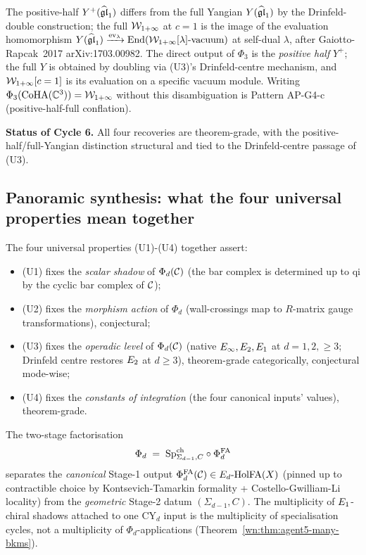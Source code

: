 \begin{remark}
\label{wn:rem:agent5-positive-half-vs-full}
The positive-half $Y^+(\widehat{\mathfrak{gl}}_1)$ differs from the full
Yangian $Y(\widehat{\mathfrak{gl}}_1)$ by the Drinfeld-double construction;
the full $\mathcal{W}_{1+\infty}$ at $c = 1$ is the image of the evaluation
homomorphism $Y(\widehat{\mathfrak{gl}}_1) \xrightarrow{\mathrm{ev}_\lambda} \mathrm{End}(\mathcal{W}_{1+\infty}[\lambda]\text{-vacuum})$
at self-dual $\lambda$, after Gaiotto-Rapcak~2017 arXiv:1703.00982.
The direct output of $\Phi_3$ is the \emph{positive half} $Y^+$; the
full $Y$ is obtained by doubling via (U3)'s Drinfeld-centre mechanism,
and $\mathcal{W}_{1+\infty}[c=1]$ is its evaluation on a specific vacuum module.
Writing $\Phi_3(\mathrm{CoHA}(\mathbb{C}^3)) = \mathcal{W}_{1+\infty}$ without this disambiguation
is Pattern AP-G4-c (positive-half-full conflation).
\end{remark}

\medskip
\noindent\textbf{Status of Cycle 6.} All four recoveries are theorem-grade,
with the positive-half/full-Yangian distinction structural and tied to
the Drinfeld-centre passage of (U3).

\subsection*{Panoramic synthesis: what the four universal properties mean together}

The four universal properties (U1)-(U4) together assert:
\begin{itemize}
\item (U1) fixes the \emph{scalar shadow} of $\Phi_d(\mathcal{C})$ (the bar
complex is determined up to qi by the cyclic bar complex of $\mathcal{C}$);
\item (U2) fixes the \emph{morphism action} of $\Phi_d$ (wall-crossings
map to $R$-matrix gauge transformations), conjectural;
\item (U3) fixes the \emph{operadic level} of $\Phi_d(\mathcal{C})$ (native
$E_\infty, E_2, E_1$ at $d = 1, 2, \ge 3$; Drinfeld centre restores
$E_2$ at $d \ge 3$), theorem-grade categorically, conjectural mode-wise;
\item (U4) fixes the \emph{constants of integration} (the four canonical
inputs' values), theorem-grade.
\end{itemize}

The two-stage factorisation
\[
  \Phi_d \;=\; \mathrm{Sp}^{\mathrm{ch}}_{\Sigma_{d-1}, C} \circ \Phi^{\mathrm{FA}}_d
\]
separates the \emph{canonical} Stage-1 output $\Phi^{\mathrm{FA}}_d(\mathcal{C}) \in E_d\text{-}\mathrm{HolFA}(X)$
(pinned up to contractible choice by Kontsevich-Tamarkin formality +
Costello-Gwilliam-Li locality) from the \emph{geometric} Stage-2 datum
$(\Sigma_{d-1}, C)$. The multiplicity of $E_1$-chiral shadows attached
to one CY$_d$ input is the multiplicity of specialisation cycles, not a
multiplicity of $\Phi_d$-applications (Theorem~\ref{wn:thm:agent5-many-bkms}).

